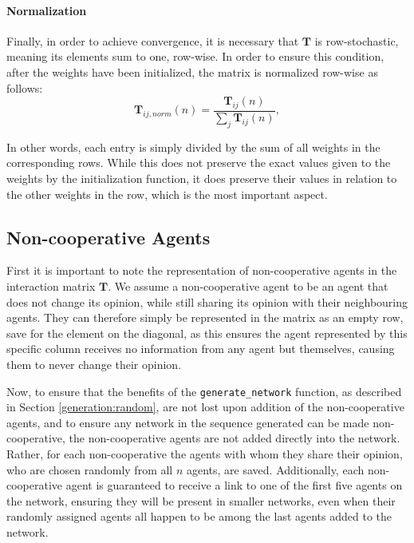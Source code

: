 \documentclass[a4paper, 12pt]{report}
\newcommand{\T}{\bm{T}}
\begin{document}
\paragraph{Normalization}
\label{weights:normalization}
Finally, in order to achieve convergence, it is necessary that $\T$ is row-stochastic, meaning its elements sum to one, row-wise. In order to ensure this condition, after the weights have been initialized, the matrix is normalized row-wise as follows:
\begin{equation*}
    \T_{ij, norm}(n) = \frac{\T_{ij}(n)}{\sum_{j}\T_{ij}(n)},
\end{equation*}

In other words, each entry is simply divided by the sum of all weights in the corresponding rows. While this does not preserve the exact values given to the weights by the initialization function, it does preserve their values in relation to the other weights in the row, which is the most important aspect.

\newpage

\subsection{Non-cooperative Agents}

First it is important to note the representation of non-cooperative agents in the interaction matrix $\T$. We assume a non-cooperative agent to be an agent that does not change its opinion, while still sharing its opinion with their neighbouring agents. They can therefore simply be represented in the matrix as an empty row, save for the element on the diagonal, as this ensures the agent represented by this specific column receives no information from any agent but themselves, causing them to never change their opinion.

Now, to ensure that the benefits of the \texttt{generate\_network} function, as described in Section \ref{generation:random}, are not lost upon addition of the non-cooperative agents, and to ensure any network in the sequence generated can be made non-cooperative, the non-cooperative agents are not added directly into the network. Rather, for each non-cooperative the agents with whom they share their opinion, who are chosen randomly from all $n$ agents, are saved. Additionally, each non-cooperative agent is guaranteed to receive a link to one of the first five agents on the network, ensuring they will be present in smaller networks, even when their randomly assigned agents all happen to be among the last agents added to the network.
\end{document}
